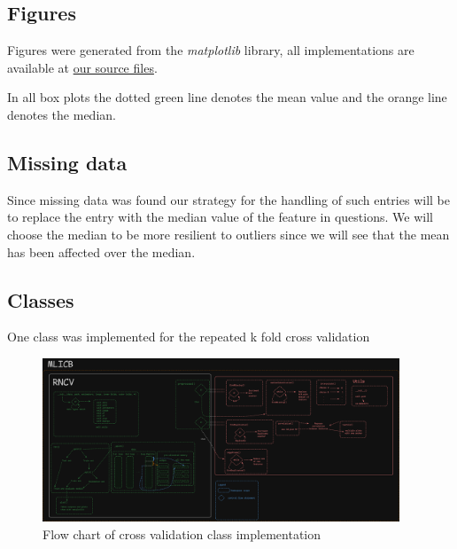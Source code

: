 \documentclass[12pt, a4paper]{article}
\begin{document}
\begin{multicols}{2}
    \subsection{Figures} \label{subsec:figs}

    Figures were generated from the \textit{matplotlib} \cite{noauthor_matplotlib_nodate} library, all implementations are available at \href{https://github.com/ArisPodotas/Assignment-1-MLICB/blob/main/src/functions.py}{our source files}.
    \newline

    In all box plots the dotted green line denotes the mean value and the orange line denotes the median.
    \newline

    \subsection{Missing data} \label{subsec:missing}

    Since missing data was found our strategy for the handling of such entries will be to replace the entry with the median value of the feature in questions. We will choose the median to be more resilient to outliers since we will see that the mean has been affected over the median.
    \newline

    \subsection{Classes} \label{subsec:class}

    One class was implemented for the repeated k fold cross validation
    \newline

\end{multicols}

    \begin{figure}[H]
        \begin{center}
            \includegraphics[width=0.95\textwidth]{figures/rcv.png}
        \end{center}
        \caption{Flow chart of cross validation class implementation}\label{fig:class outline}
    \end{figure}
\end{document}
